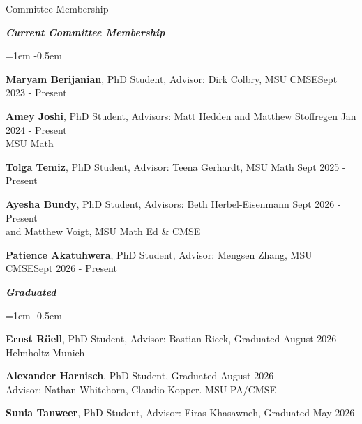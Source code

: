 \documentclass{resume} %
\begin{document}
\begin{rSection}{Committee Membership}


\textbf{\textit{Current Committee Membership}}
\begin{list}{}{\leftmargin=1em}
   \itemsep -0.5em %


   \item \textbf{Maryam Berijanian}, PhD Student, Advisor: Dirk Colbry, MSU CMSE\hfill Sept 2023 - Present
   \item \textbf{Amey Joshi}, PhD Student, Advisors: Matt Hedden and Matthew Stoffregen \hfill Jan 2024 - Present\\
   \phantom{xxx}MSU Math
   \item \textbf{Tolga Temiz}, PhD Student, Advisor: Teena Gerhardt, MSU Math \hfill Sept 2025 - Present
   \item \textbf{Ayesha Bundy}, PhD Student, Advisors:  Beth Herbel-Eisenmann \hfill Sept 2026 - Present\\ 
   \phantom{xxx}and Matthew Voigt, MSU Math Ed \& CMSE
   \item \textbf{Patience Akatuhwera}, PhD Student, Advisor: Mengsen Zhang, MSU CMSE\hfill Sept 2026 - Present
\end{list}
\textbf{\textit{Graduated}}
\begin{list}{}{\leftmargin=1em}
   \itemsep -0.5em %
   \item \textbf{Ernst Röell}, PhD Student, Advisor: Bastian Rieck, \hfill Graduated August 2026\\ 
   \phantom{xxx}Helmholtz Munich
   \item \textbf{Alexander Harnisch}, PhD Student,  \hfill Graduated August 2026\\
   \phantom{xxx}Advisor: Nathan Whitehorn, Claudio Kopper. MSU PA/CMSE
   \item \textbf{Sunia Tanweer}, PhD Student, Advisor: Firas Khasawneh, \hfill  Graduated May 2026\\

\end{list}
\end{rSection}
\end{document}
